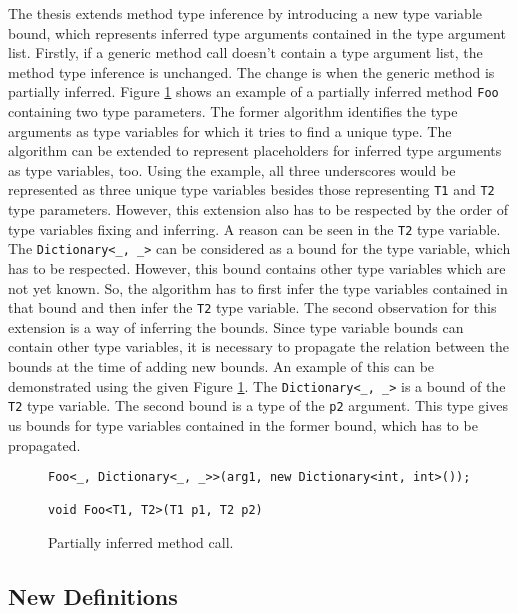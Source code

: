 The thesis extends method type inference by introducing a new type variable bound, which represents inferred type arguments contained in the type argument list. 
Firstly, if a generic method call doesn’t contain a type argument list, the method type inference is unchanged. The change is when the generic method is partially inferred. 
Figure \ref{img54:partInf} shows an example of a partially inferred method \texttt{Foo} containing two type parameters. 
The former algorithm identifies the type arguments as type variables for which it tries to find a unique type. 
The algorithm can be extended to represent placeholders for inferred type arguments as type variables, too. 
Using the example, all three underscores would be represented as three unique type variables besides those representing \texttt{T1} and \texttt{T2} type parameters. 
However, this extension also has to be respected by the order of type variables fixing and inferring. 
A reason can be seen in the \texttt{T2} type variable. 
The \texttt{Dictionary<\_, \_>} can be considered as a bound for the type variable, which has to be respected. 
However, this bound contains other type variables which are not yet known. 
So, the algorithm has to first infer the type variables contained in that bound and then infer the \texttt{T2} type variable. 
The second observation for this extension is a way of inferring the bounds. 
Since type variable bounds can contain other type variables, it is necessary to propagate the relation between the bounds at the time of adding new bounds. 
An example of this can be demonstrated using the given Figure \ref{img54:partInf}. 
The \texttt{Dictionary<\_, \_>} is a bound of the \texttt{T2} type variable. 
The second bound is a type of the \texttt{p2} argument. 
This type gives us bounds for type variables contained in the former bound, which has to be propagated.
\begin{figure}[h!]
\begin{lstlisting}[style=csharp]
Foo<_, Dictionary<_, _>>(arg1, new Dictionary<int, int>());

void Foo<T1, T2>(T1 p1, T2 p2)
\end{lstlisting}
\caption{Partially inferred method call.}
\label{img54:partInf}
\end{figure}

\subsection{New Definitions}

